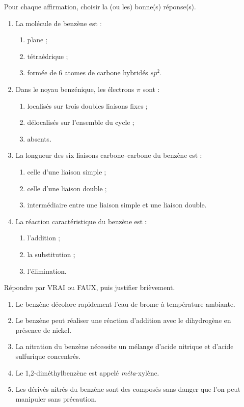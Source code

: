 \documentclass[11pt]{article}
\begin{document}
\begin{exercice}
Pour chaque affirmation, choisir la (ou les) bonne(s) réponse(s).
\begin{enumerate}
\item La molécule de benzène  est :
\begin{enumerate}
\item plane ; \item tétraédrique ; \item formée de 6 atomes de carbone hybridés $sp^2$.
\end{enumerate}
\item Dans le noyau benzénique, les électrons $\pi$ sont :
\begin{enumerate}
\item localisés sur trois doubles liaisons fixes ;
\item délocalisés sur l'ensemble du cycle ;
\item absents.
\end{enumerate}
\item La longueur des six liaisons carbone--carbone du benzène est :
\begin{enumerate}
\item celle d'une liaison simple  ;
\item celle d'une liaison double  ;
\item intermédiaire entre une liaison simple et une liaison double.
\end{enumerate}
\item La réaction caractéristique du benzène est :
\begin{enumerate}
\item l'addition ; \item la substitution ; \item l'élimination.
\end{enumerate}
\end{enumerate}
\end{exercice}

\begin{exercice}
Répondre par VRAI ou FAUX, puis justifier brièvement.
\begin{enumerate}
\item Le benzène décolore rapidement l'eau de brome à température ambiante.
\item Le benzène peut réaliser une réaction d'addition avec le dihydrogène en présence de nickel.
\item La nitration du benzène nécessite un mélange d'acide nitrique et d'acide sulfurique concentrés.
\item Le 1,2-diméthylbenzène est appelé \emph{méta}-xylène.
\item Les dérivés nitrés du benzène sont des composés sans danger que l'on peut manipuler sans précaution.
\end{enumerate}
\end{exercice}
\end{document}
